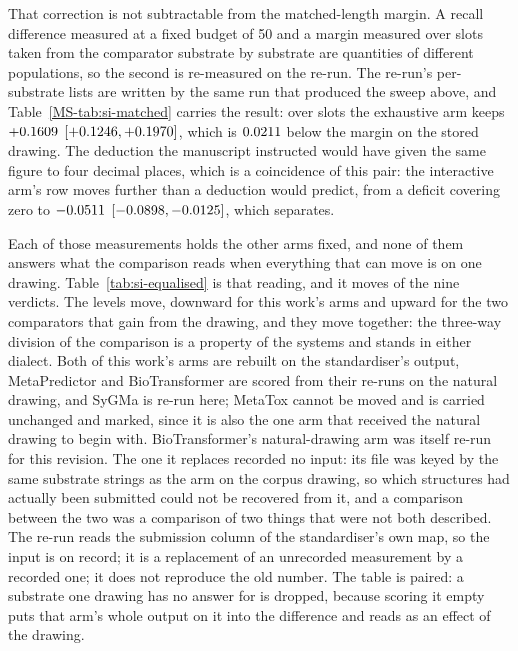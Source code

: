 \documentclass[journal=jcisd8,manuscript=suppinfo,layout=onecolumn]{achemso}
\begin{document}
That correction is not subtractable from the matched-length margin. A recall difference measured at
a fixed budget of 50 and a margin measured over
\numMatchedBanksygmaSlots{} slots taken from the comparator substrate by substrate are quantities
of different populations, so the second is re-measured on the re-run. The re-run's per-substrate
lists are written by the same run that produced the sweep above,
and Table~\ref{MS-tab:si-matched} carries the result: over \numMatchedBanksygmastdSlots{} slots
the exhaustive arm keeps $+0.1609$
$[+0.1246, +0.1970]$, which is
$0.0211$ below the margin on the stored drawing. The deduction the manuscript
instructed would have given the same figure to four decimal places, which is a coincidence of this
pair: the interactive arm's row moves further than a deduction would predict, from
a deficit covering zero to $-0.0511$
$[-0.0898, -0.0125]$, which separates.



Each of those measurements holds the other arms fixed, and none of them answers what the comparison
reads when everything that can move is on one
drawing. Table~\ref{tab:si-equalised} is that reading, and it moves \numEqualisedMovedWord{}
of the nine verdicts. The levels move, downward for this work's arms and upward for the two
comparators that gain from the drawing, and they move together: the three-way division of the
comparison is a property of the systems and stands in either dialect. Both of this work's arms are
rebuilt on
the standardiser's output, MetaPredictor and BioTransformer are scored from their re-runs on the
natural drawing, and SyGMa is re-run here; MetaTox cannot be moved and is carried unchanged and
marked, since it is also the one arm that received the natural drawing to begin with.
BioTransformer's natural-drawing arm was itself re-run for this revision. The one it replaces
recorded no input: its file was keyed by the same substrate strings as the arm on the corpus
drawing, so which structures had actually been submitted could not be recovered from it, and a
comparison between the two was a comparison of two things that were not both described. The re-run
reads the submission column of the standardiser's own map, so the input is on record; it is a
replacement of an unrecorded measurement by a recorded one; it does not reproduce the old
number. The table is paired: a substrate one drawing has no answer for is dropped, because scoring it
empty puts that arm's whole output on it into the difference and
reads as an effect of the drawing.
\end{document}
